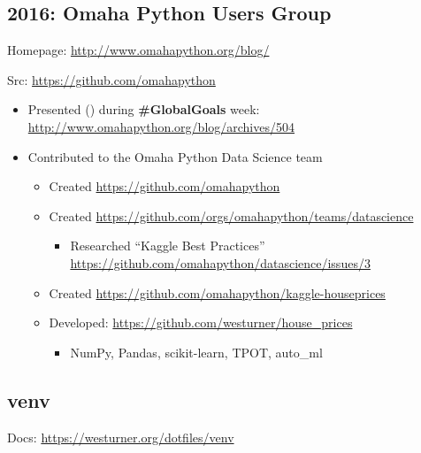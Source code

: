 \documentclass[letter,,openany,oneside]{sphinxhowto}
\begin{document}
\subsection{2016: Omaha Python Users Group}
\label{resume:omaha-python-users-group}
\begin{DUlineblock}{0em}
\item[] Homepage: \url{http://www.omahapython.org/blog/}
\item[] Src: \url{https://github.com/omahapython}
\end{DUlineblock}
\begin{itemize}
\item {} 
Presented {\hyperref[resume:pyglobalgoals]{}} () during \textbf{\#GlobalGoals} week:
\url{http://www.omahapython.org/blog/archives/504}

\item {} 
Contributed to the Omaha Python Data Science team
\begin{itemize}
\item {} 
Created \url{https://github.com/omahapython}

\item {} 
Created \url{https://github.com/orgs/omahapython/teams/datascience}
\begin{itemize}
\item {} 
Researched ``Kaggle Best Practices''
\url{https://github.com/omahapython/datascience/issues/3}

\end{itemize}

\item {} 
Created \url{https://github.com/omahapython/kaggle-houseprices}

\item {} 
Developed: \url{https://github.com/westurner/house\_prices}
\begin{itemize}
\item {} 
NumPy, Pandas, scikit-learn, TPOT, auto\_ml

\end{itemize}

\end{itemize}

\end{itemize}


\subsection{venv}
\label{resume:venv}
\begin{DUlineblock}{0em}
\item[] Docs: \url{https://westurner.org/dotfiles/venv}
\end{DUlineblock}
\end{document}
